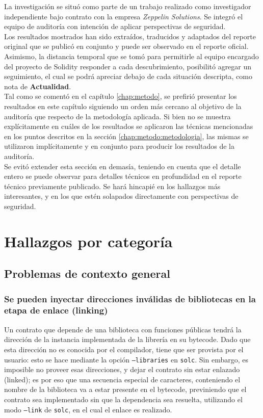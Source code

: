 La investigación se situó como parte de un trabajo realizado como investigador independiente bajo contrato con la empresa \textit{Zeppelin Solutions}. Se integró el equipo de auditoría con intención de aplicar perspectivas de seguridad.\\

Los resultados mostrados han sido extraídos, traducidos y adaptados del reporte original que se publicó en conjunto y puede ser observado en el reporte oficial\cite{SolidityCompilerAuditReportZep}. Asimismo, la distancia temporal que se tomó para permitirle al equipo encargado del proyecto de Solidity responder a cada descubrimiento, posibilitó agregar un seguimiento, el cual se podrá apreciar debajo de cada situación descripta, como nota de \textbf{Actualidad}.\\

Tal como se comentó en el capítulo \ref{chap:metodo}, se prefirió presentar los resultados en este capítulo siguiendo un orden más cercano al objetivo de la auditoría que respecto de la metodología aplicada. Si bien no se muestra explícitamente en cuáles de los resultados se aplicaron las técnicas mencionadas en los puntos descritos en la sección \ref{chap:metodo:metodologia}, las mismas se utilizaron implícitamente y en conjunto para producir los resultados de la auditoría.\\

Se evitó extender esta sección en demasía, teniendo en cuenta que el detalle entero se puede observar para detalles técnicos en profundidad en el reporte técnico previamente publicado. Se hará hincapié en los hallazgos más interesantes, y en los que estén solapados directamente con perspectivas de seguridad.


\section{Hallazgos por categoría}
\subsection{Problemas de contexto general}
\subsubsection{Se pueden inyectar direcciones inválidas de bibliotecas en la etapa de enlace (linking)
}

Un contrato que depende de una biblioteca con funciones públicas tendrá la dirección de la instancia implementada de la librería en su bytecode. Dado que esta dirección no es conocida por el compilador, tiene que ser provista por el usuario: esto se hace mediante la opción \texttt{--libraries} en \texttt{solc}. Sin embargo, es imposible no proveer esas direcciones, y dejar el contrato sin estar enlazado (linked); es por eso que una secuencia especial de caracteres, conteniendo el nombre de la biblioteca va a estar presente en el bytecode, previniendo que el contrato sea implementado sin que la dependencia sea resuelta, utilizando el modo \texttt{--link} de \texttt{solc}, en el cual el enlace es realizado.\\

